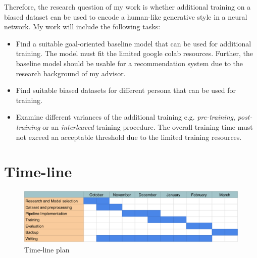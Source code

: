\documentclass[11pt]{article}
\begin{document}
Therefore, the research question of my work is whether additional training on a biased dataset can be used to encode a human-like generative style in a neural network.
My work will include the following tasks:
\begin{itemize}
\item Find a suitable  goal-oriented baseline model that can be used for additional training. The model must fit the limited google colab resources. Further, the baseline model should be usable for a recommendation system due to the research background of my advisor.
\item Find suitable biased datasets for different persona that can be used for training.
\item Examine different variances of the additional training e.g. \textit{pre-training}, \textit{post-training} or an \textit{interleaved} training procedure. The overall training time must not exceed an acceptable threshold due to the limited training resources.
\end{itemize}
\section{Time-line}
\begin{figure}[h]
\centering
\includegraphics[width=\textwidth]{time-table.png}
\caption{Time-line plan}
\end{figure}


\end{document}
